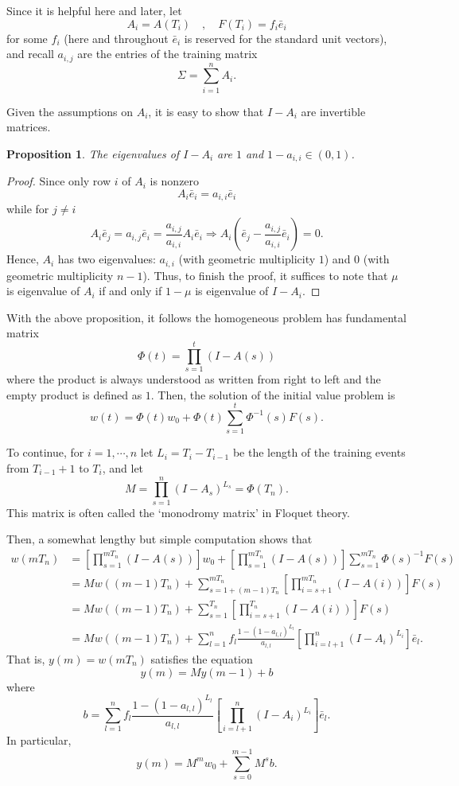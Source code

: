 \documentclass[]{interact}
\theoremstyle{plain}%
\newtheorem{proposition}[theorem]{Proposition}
\theoremstyle{definition}
\theoremstyle{remark}
\newcommand{\quot}[1]{`#1'}
\begin{document}
Since it is helpful here and later, let 
\[
A_i=A(T_i) \quad , \quad F(T_i)=f_i\bar{e}_i
\]
for some $f_i$ (here and throughout $\bar{e}_i$ is reserved for the standard unit vectors), and recall $a_{i,j}$ are the entries of the training matrix
\[
\Sigma=\sum_{i=1}^{n}A_{i}.
\]

Given the assumptions on $A_i$, it is easy to show that $I-A_i$ are invertible matrices.
\begin{proposition}
The eigenvalues of $I-A_i$ are $1$ and $1-a_{i,i}\in (0,1)$.
\end{proposition}
\begin{proof}
Since only row $i$ of $A_i$ is nonzero
\[
A_i\bar{e}_i=a_{i,i}\bar{e}_i
\]
while for $j\neq i$
\[
A_i\bar{e}_j=a_{i,j}\bar{e}_i=\frac{a_{i,j}}{a_{i,i}}A_i\bar{e}_i \Rightarrow A_i(\bar{e}_j-\frac{a_{i,j}}{a_{i,i}}\bar{e}_i)=0.
\]
Hence, $A_i$ has two eigenvalues: $a_{i,i}$ (with geometric multiplicity $1$) and $0$ (with geometric multiplicity $n-1$).
Thus, to finish the proof, it suffices to note that $\mu$ is eigenvalue of $A_i$ if and only if $1-\mu$ is eigenvalue of $I-A_i$.
\end{proof}

With the above proposition, it follows the homogeneous problem has fundamental matrix
\[
\Phi(t)=\prod_{s=1}^{t}(I-A(s))
\]
where the product is always understood as written from right to left and the empty product is defined as $1$. Then, the solution of the initial value problem is 
\[
w(t)=\Phi(t)w_0 + \Phi(t)\sum_{s=1}^{t}\Phi^{-1}(s)F(s).
\]

To continue, for $i=1,\cdots,n$ let $L_{i}=T_{i}-T_{i-1}$ be the length of the training events from $T_{i-1}+1$ to $T_{i}$, and let
\[
M=\prod_{s=1}^n(I-A_s)^{L_s}=\Phi(T_n).
\]
This matrix is often called the \quot{monodromy matrix} in Floquet theory.

Then, a somewhat lengthy but simple computation shows that
\begin{align*}
w(mT_{n})&= \left[ \prod_{s=1}^{mT_n}(I-A(s))\right] w_0+ \left[ \prod_{s=1}^{mT_n}(I-A(s))\right]\sum_{s=1}^{mT_{n}}\Phi(s)^{-1} F(s)\\
	&= Mw((m-1)T_n)+\sum_{s=1+(m-1)T_n}^{mT_{n}}\left[ \prod_{i=s+1}^{mT_n}(I-A(i))\right] F(s) \\
	&= Mw((m-1)T_n)+ \sum_{s=1}^{T_{n}}\left[ \prod_{i=s+1}^{T_n}(I-A(i))\right] F(s) \\
	&= Mw((m-1)T_n)+\sum_{l=1}^nf_l\frac{1-(1-a_{l,l})^{L_l}}{a_{l,l}}\left[ \prod_{i=l+1}^{n}(I-A_i)^{L_i}\right]\bar{e}_l .
\end{align*}
That is, $y(m)=w(mT_n)$ satisfies the equation
\[
y(m)= My(m-1)+b
\]
where
\[
b=\sum_{l=1}^nf_l\frac{1-(1-a_{l,l})^{L_l}}{a_{l,l}}\left[ \prod_{i=l+1}^{n}(I-A_i)^{L_i}\right]\bar{e}_l .
\]
In particular, 
\[
y(m)=M^{m}w_0+\sum_{s=0}^{m-1}M^{s}b.
\]
\end{document}
